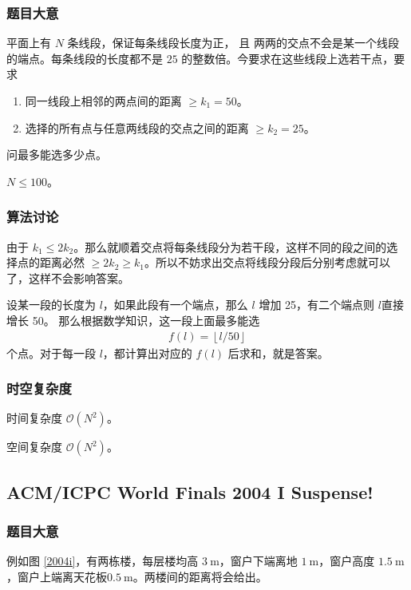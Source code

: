 			\subsubsection{题目大意}
				平面上有 $N$ 条线段，保证每条线段长度为正，
				且
				两两的交点不会是某一个线段的端点。每条线段的长度都不是 $25$ 的整数倍。今要求在这些线段上选若干点，要求
				\begin{enumerate}
					\item 同一线段上相邻的两点间的距离 $\ge k_1 = 50$。
					\item 选择的所有点与任意两线段的交点之间的距离 $\ge k_2 = 25$。
				\end{enumerate}
				问最多能选多少点。
				
				$N \le 100$。
			\subsubsection{算法讨论}
				由于 $k_1 \le 2 k_2$。那么就顺着交点将每条线段分为若干段，这样不同的段之间的选择点的距离必然 $\ge 2k_2 \ge k_1$。所以不妨求出交点将线段分段后分别考虑就可以了，这样不会影响答案。
				
				设某一段的长度为 $l$，如果此段有一个端点，那么 $l$ 增加 25，有二个端点则 $l$直接增长 50。
				那么根据数学知识，这一段上面最多能选
				\begin{align}
					f(l) = \left\lfloor l / 50 \right\rfloor
				\end{align}
				个点。对于每一段 $l$，都计算出对应的 $f(l)$ 后求和，就是答案。
				
			\subsubsection{时空复杂度}
				时间复杂度 $\mathcal{O}\left(N^2\right)$。
					
				空间复杂度 $\mathcal{O}\left(N^2\right)$。
				
		\newpage
		\subsection{ACM/ICPC World Finals 2004 I Suspense!}
			\subsubsection{题目大意}
				例如图 \ref{2004i}，有两栋楼，每层楼均高 $\SI{3}{\meter}$，窗户下端离地 $\SI{1}{\meter}$，窗户高度 $\SI{1.5}{\meter}$，窗户上端离天花板$\SI{0.5}{\meter}$。两楼间的距离将会给出。
				
